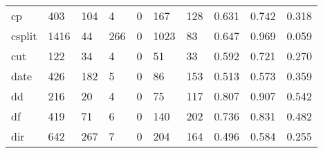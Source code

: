 \begin{longtable}{lp{2.0cm}p{2.0cm}p{2.0cm}p{2.0cm}p{2.0cm}p{2.0cm}p{2.0cm}p{2.0cm}p{2.0cm}}
cp        &                    403 &                                104 &                                 4 &                                0 &                               167 &                             128 &                                0.631 &                                  0.742 &                                0.318 \\
csplit    &                   1416 &                                 44 &                               266 &                                0 &                              1023 &                              83 &                                0.647 &                                  0.969 &                                0.059 \\
cut       &                    122 &                                 34 &                                 4 &                                0 &                                51 &                              33 &                                0.592 &                                  0.721 &                                0.270 \\
date      &                    426 &                                182 &                                 5 &                                0 &                                86 &                             153 &                                0.513 &                                  0.573 &                                0.359 \\
dd        &                    216 &                                 20 &                                 4 &                                0 &                                75 &                             117 &                                0.807 &                                  0.907 &                                0.542 \\
df        &                    419 &                                 71 &                                 6 &                                0 &                               140 &                             202 &                                0.736 &                                  0.831 &                                0.482 \\
dir       &                    642 &                                267 &                                 7 &                                0 &                               204 &                             164 &                                0.496 &                                  0.584 &                                0.255 \\

\end{longtable}
